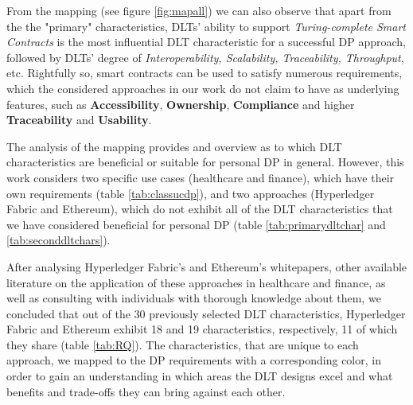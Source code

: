 From the mapping (see figure \ref{fig:mapall}) we can also observe that apart from the the "primary" characteristics, DLTs' ability to support \textit{Turing-complete Smart Contracts} is the most influential DLT characteristic for a successful DP approach, followed by DLTs' degree of \textit{Interoperability, Scalability, Traceability, Throughput}, etc. Rightfully so, smart contracts can be used to satisfy numerous requirements, which the considered approaches in our work do not claim to have as underlying features, such as \textbf{Accessibility}, \textbf{Ownership}, \textbf{Compliance} and higher \textbf{Traceability} and \textbf{Usability}. 

The analysis of the mapping provides and overview as to which DLT characteristics are beneficial or suitable for personal DP in general. However, this work considers two specific use cases (healthcare and finance), which have their own requirements (table \ref{tab:classucdp}), and two approaches (Hyperledger Fabric and Ethereum), which do not exhibit all of the DLT characteristics that we have considered beneficial for personal DP (table \ref{tab:primarydltchar} and \ref{tab:seconddltchars}).\newline


After analysing Hyperledger Fabric's and Ethereum's whitepapers, other available literature on the application of these approaches in healthcare and finance, as well as consulting with individuals with thorough knowledge about them, we concluded that out of the 30 previously selected DLT characteristics, Hyperledger Fabric and Ethereum exhibit 18 and 19 characteristics, respectively, 11 of which they share (table \ref{tab:RQ}). The characteristics, that are unique to each approach, we mapped to the DP requirements with a corresponding color, in order to gain an understanding in which areas the DLT designs excel and what benefits and trade-offs they can bring against each other. 

